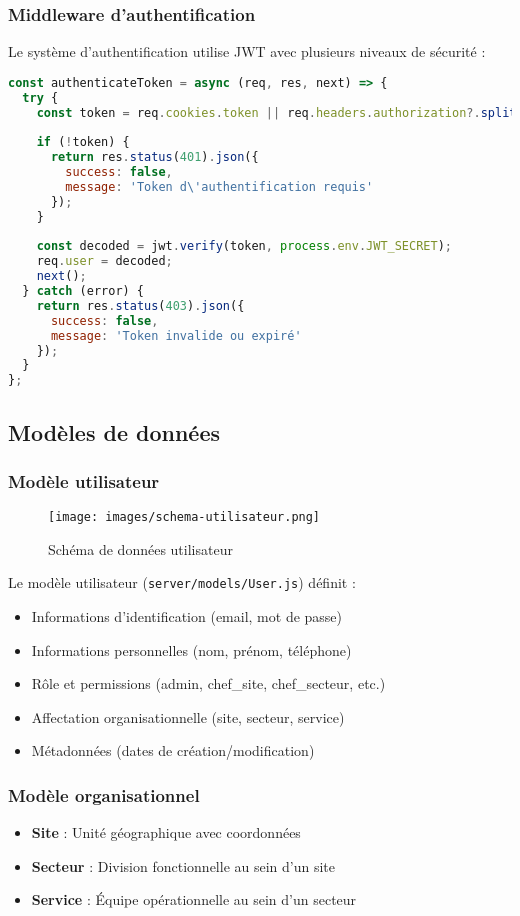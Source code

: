 \subsubsection{Middleware d'authentification}
Le système d'authentification utilise JWT avec plusieurs niveaux de sécurité :

\begin{lstlisting}[language=JavaScript, caption=Middleware d'authentification]
const authenticateToken = async (req, res, next) => {
  try {
    const token = req.cookies.token || req.headers.authorization?.split(' ')[1];
    
    if (!token) {
      return res.status(401).json({ 
        success: false, 
        message: 'Token d\'authentification requis' 
      });
    }
    
    const decoded = jwt.verify(token, process.env.JWT_SECRET);
    req.user = decoded;
    next();
  } catch (error) {
    return res.status(403).json({ 
      success: false, 
      message: 'Token invalide ou expiré' 
    });
  }
};
\end{lstlisting}

\subsection{Modèles de données}
\subsubsection{Modèle utilisateur}
\begin{figure}[h]
\centering
\texttt{[image: images/schema-utilisateur.png]}
\caption{Schéma de données utilisateur}
\label{fig:schema-utilisateur}
\end{figure}

Le modèle utilisateur (\texttt{server/models/User.js}) définit :
\begin{itemize}
    \item Informations d'identification (email, mot de passe)
    \item Informations personnelles (nom, prénom, téléphone)
    \item Rôle et permissions (admin, chef\_site, chef\_secteur, etc.)
    \item Affectation organisationnelle (site, secteur, service)
    \item Métadonnées (dates de création/modification)
\end{itemize}

\subsubsection{Modèle organisationnel}
\begin{itemize}
    \item \textbf{Site} : Unité géographique avec coordonnées
    \item \textbf{Secteur} : Division fonctionnelle au sein d'un site
    \item \textbf{Service} : Équipe opérationnelle au sein d'un secteur
\end{itemize}

